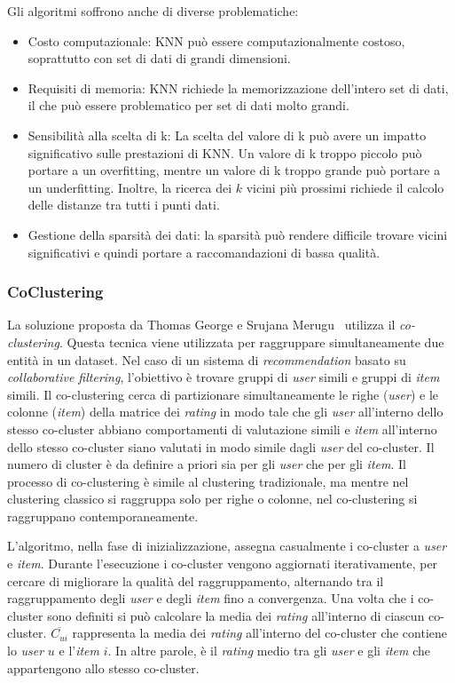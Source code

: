 Gli algoritmi soffrono anche di diverse problematiche:
\begin{itemize}
    \item Costo computazionale: KNN può essere computazionalmente costoso, soprattutto con set di dati di grandi dimensioni.
    \item Requisiti di memoria: KNN richiede la memorizzazione dell'intero set di dati, il che può essere problematico per set di dati molto grandi.
    \item Sensibilità alla scelta di k: La scelta del valore di k può avere un impatto significativo sulle prestazioni di KNN. Un valore di k troppo piccolo può portare a un overfitting, mentre un valore di k troppo grande può portare a un underfitting. Inoltre, la ricerca dei \(k\) vicini più prossimi richiede il calcolo delle distanze tra tutti i punti dati.
    \item Gestione della sparsità dei dati: la sparsità può rendere difficile trovare vicini significativi e quindi portare a raccomandazioni di bassa qualità.
\end{itemize}

\subsubsection{CoClustering}\label{coclustering}

La soluzione proposta da Thomas George e Srujana Merugu~\cite{Co-Clustering} utilizza il \textit{co-clustering}. Questa tecnica viene utilizzata per raggruppare simultaneamente due entità in un dataset. Nel caso di un sistema di \textit{recommendation} basato su \textit{collaborative filtering}, l'obiettivo è trovare gruppi di \textit{user} simili e gruppi di \textit{item} simili. Il co-clustering cerca di partizionare simultaneamente le righe (\textit{user}) e le colonne (\textit{item}) della matrice dei \textit{rating} in modo tale che gli \textit{user} all'interno dello stesso co-cluster abbiano comportamenti di valutazione simili e \textit{item} all'interno dello stesso co-cluster siano valutati in modo simile dagli \textit{user} del co-cluster. Il numero di cluster è da definire a priori sia per gli \textit{user} che per gli \textit{item}. Il processo di co-clustering è simile al clustering tradizionale, ma mentre nel clustering classico si raggruppa solo per righe o colonne, nel co-clustering si raggruppano contemporaneamente. 

L'algoritmo, nella fase di inizializzazione, assegna casualmente i co-cluster a \textit{user} e \textit{item}. Durante l'esecuzione i co-cluster vengono aggiornati iterativamente, per cercare di migliorare la qualità del raggruppamento, alternando tra il raggruppamento degli \textit{user} e degli \textit{item} fino a convergenza. Una volta che i co-cluster sono definiti si può calcolare la media dei \textit{rating} all'interno di ciascun co-cluster. $ \overline{C_{ui}} $ rappresenta la media dei \textit{rating} all'interno del co-cluster che contiene lo \textit{user} $ u $ e l'\textit{item} $ i $. In altre parole, è il \textit{rating} medio tra gli \textit{user} e gli \textit{item} che appartengono allo stesso co-cluster.

